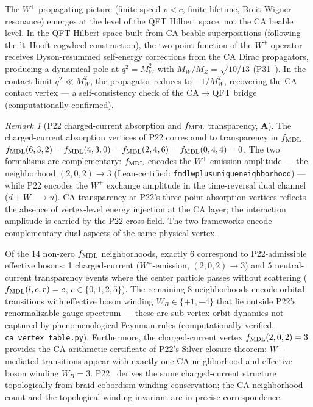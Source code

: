 \documentclass[11pt]{article}
\theoremstyle{remark}
\newtheorem{remark}[theorem]{Remark}
\newcommand{\lean}[1]{%
  \penalty-100
  \begingroup\def\_{\textunderscore\allowbreak}\texttt{#1}\endgroup}
\newcommand{\CatA}{\textbf{A}}
\begin{document}
The $W^+$ propagating picture (finite speed $v < c$, finite lifetime,
Breit-Wigner resonance) emerges at the level of the QFT Hilbert space, not the
CA beable level.
In the QFT Hilbert space built from CA beable superpositions (following the
't~Hooft cogwheel construction), the two-point function of the $W^+$ operator
receives Dyson-resummed self-energy corrections from the CA Dirac propagators,
producing a dynamical pole at $q^2 = M_W^2$ with $M_W/M_Z = \sqrt{10/13}$
(P31~\cite{SpivackWeinbergAngle}).
In the contact limit $q^2 \ll M_W^2$, the propagator reduces to $-1/M_W^2$,
recovering the CA contact vertex --- a self-consistency check of the
CA$\to$QFT bridge (computationally confirmed).

\begin{remark}[P22 charged-current absorption and $f_{\rm MDL}$ transparency, $\CatA$]
\label{rem:p22_transparency}
The charged-current absorption vertices of P22 correspond to transparency in
$f_{\rm MDL}$:
$f_{\rm MDL}(6,3,2) = f_{\rm MDL}(4,3,0) = f_{\rm MDL}(2,4,6) = f_{\rm MDL}(0,4,4) = 0$.
The two formalisms are complementary:
$f_{\rm MDL}$ encodes the $W^+$ emission amplitude --- the neighborhood
$(2,0,2) \to 3$ (Lean-certified: \lean{fmdl\_w\_plus\_unique\_neighborhood}) ---
while P22 encodes the $W^+$ exchange amplitude in the time-reversal dual channel
($d + W^+ \to u$).
CA transparency at P22's three-point absorption vertices reflects the absence of
vertex-level energy injection at the CA layer; the interaction amplitude is carried
by the P22 cross-field.
The two frameworks encode complementary dual aspects of the same physical vertex.

Of the 14 non-zero $f_{\rm MDL}$ neighborhoods, exactly 6 correspond to P22-admissible
effective bosons: 1 charged-current ($W^+$-emission, $(2,0,2)\!\to\!3$) and 5 neutral-current
transparency events where the center particle passes without scattering
($f_{\rm MDL}(l,c,r) = c$, $c \in \{0,1,2,5\}$).
The remaining 8 neighborhoods encode orbital transitions with effective boson winding
$W_B \in \{+1,-4\}$ that lie outside P22's renormalizable gauge spectrum ---
these are sub-vertex orbit dynamics not captured by phenomenological Feynman rules
(computationally verified, \texttt{ca\_vertex\_table.py}).
Furthermore, the charged-current vertex $f_{\rm MDL}(2,0,2) = 3$ provides the CA-arithmetic
certificate of P22's Silver closure theorem: $W^+$-mediated transitions appear with
exactly one CA neighborhood and effective boson winding $W_B = 3$.
P22~\cite{Spivack2026_UGPDynamics} derives the same charged-current structure
topologically from braid cobordism winding conservation; the CA neighborhood count
and the topological winding invariant are in precise correspondence.
\end{remark}
\end{document}
